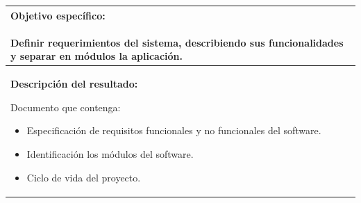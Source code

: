 \documentclass[12pt]{article}
\begin{document}
			\begin{tabular}{ |p{15cm}|} \hline
				 \parbox[c]{15cm}{ {\bf Objetivo específico:}\\ \\ Definir requerimientos del sistema, describiendo 
				 sus funcionalidades y separar en módulos la aplicación.\\} 
			\\
			 \hline
				 \parbox[c]{15cm}{ {\bf Descripción del resultado:}\\ 
				 
			Documento que contenga: \\
				 \begin{itemize}
				  \item Especificación  de requisitos funcionales y no funcionales del software.
				  \item Identificación los módulos del software.
				  \item Ciclo de vida del proyecto.
				
				 \end{itemize}
			
				 
				 
				 } 
			 \\ \hline			 
			 \end{tabular}	
			 \\ \\  \\ 
			 
\end{document}
